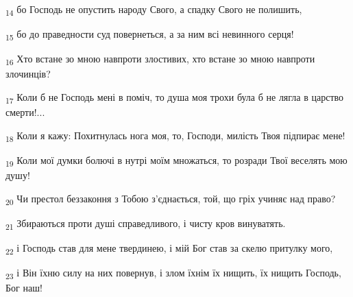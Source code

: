 \begin{tcolorbox}
\textsubscript{14} бо Господь не опустить народу Свого, а спадку Свого не полишить,
\end{tcolorbox}
\begin{tcolorbox}
\textsubscript{15} бо до праведности суд повернеться, а за ним всі невинного серця!
\end{tcolorbox}
\begin{tcolorbox}
\textsubscript{16} Хто встане зо мною навпроти злостивих, хто встане зо мною навпроти злочинців?
\end{tcolorbox}
\begin{tcolorbox}
\textsubscript{17} Коли б не Господь мені в поміч, то душа моя трохи була б не лягла в царство смерти!...
\end{tcolorbox}
\begin{tcolorbox}
\textsubscript{18} Коли я кажу: Похитнулась нога моя, то, Господи, милість Твоя підпирає мене!
\end{tcolorbox}
\begin{tcolorbox}
\textsubscript{19} Коли мої думки болючі в нутрі моїм множаться, то розради Твої веселять мою душу!
\end{tcolorbox}
\begin{tcolorbox}
\textsubscript{20} Чи престол беззаконня з Тобою з'єднається, той, що гріх учиняє над право?
\end{tcolorbox}
\begin{tcolorbox}
\textsubscript{21} Збираються проти душі справедливого, і чисту кров винуватять.
\end{tcolorbox}
\begin{tcolorbox}
\textsubscript{22} і Господь став для мене твердинею, і мій Бог став за скелю притулку мого,
\end{tcolorbox}
\begin{tcolorbox}
\textsubscript{23} і Він їхню силу на них повернув, і злом їхнім їх нищить, їх нищить Господь, Бог наш!
\end{tcolorbox}
